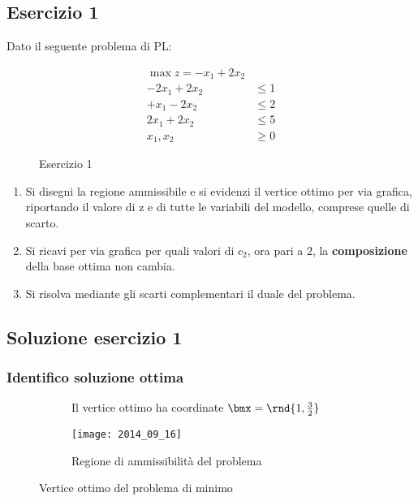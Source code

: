 \documentclass[\main/main.tex]{subfiles}
\begin{document}
\subsection{Esercizio 1}
Dato il seguente problema di PL:

\begin{figure}
  \begin{align*}
    \max z = -x_1 + 2x_2  \\
    -2x_1 + 2x_2 & \leq 1 \\
    +x_1 - 2x_2  & \leq 2 \\
    2x_1 + 2x_2  & \leq 5 \\
    x_1, x_2     & \geq 0
  \end{align*}
  \caption{Esercizio 1}
\end{figure}

\begin{enumerate}
  \item Si disegni la regione ammissibile e si evidenzi il vertice ottimo per via grafica, riportando il valore di z e di tutte le variabili del modello, comprese quelle di scarto.
  \item Si ricavi per via grafica per quali valori di $c_2$, ora pari a $2$, la \textbf{composizione} della base ottima non cambia.
  \item Si risolva mediante gli scarti complementari il duale del problema.
\end{enumerate}

\subsection{Soluzione esercizio 1}

\subsubsection*{Identifico soluzione ottima}

\begin{figure}
  \begin{subfigure}{0.49\textwidth}
    \caption{Il vertice ottimo ha coordinate $\bmx = \rnd{1, \frac{3}{2}}$}
  \end{subfigure}
  \begin{subfigure}{0.49\textwidth}
    \texttt{[image: 2014\_09\_16]}
    \caption{Regione di ammissibilità del problema}
  \end{subfigure}
  \caption{Vertice ottimo del problema di minimo}
\end{figure}
\end{document}
